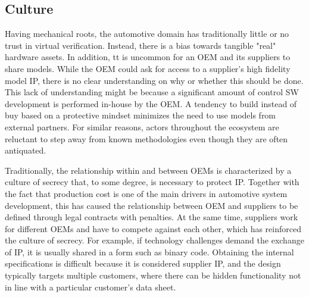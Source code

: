 \subsection{Culture}
Having mechanical roots, the automotive domain has traditionally little or no trust in virtual verification. Instead, there is a bias towards tangible "real" hardware assets.
In addition, tt is uncommon for an OEM and its suppliers to share models.
While the OEM could ask for access to a supplier’s high fidelity model IP, there is no clear understanding on why or whether this should be done.
This lack of understanding might be because a significant amount of control SW development is performed in-house by the OEM.
A tendency to build instead of buy based on a protective mindset minimizes the need to use models from external partners. For similar reasons, actors throughout the ecosystem are reluctant to step away from known methodologies even though they are often antiquated.

Traditionally, the relationship within and between OEMs is characterized by a culture of secrecy that, to some degree, is necessary to protect IP. Together with the fact that production cost is one of the main drivers in automotive system development, this has caused the relationship between OEM and suppliers to be defined through legal contracts with penalties. At the same time, suppliers work for different OEMs and have to compete against each other, which has reinforced the culture of secrecy.
For example, if technology challenges demand the exchange of IP, it is usually shared in a form such as binary code.
Obtaining the internal specifications is difficult because it is considered supplier IP, and the design typically targets multiple customers, where there can be hidden functionality not in line with a particular customer’s data sheet.


